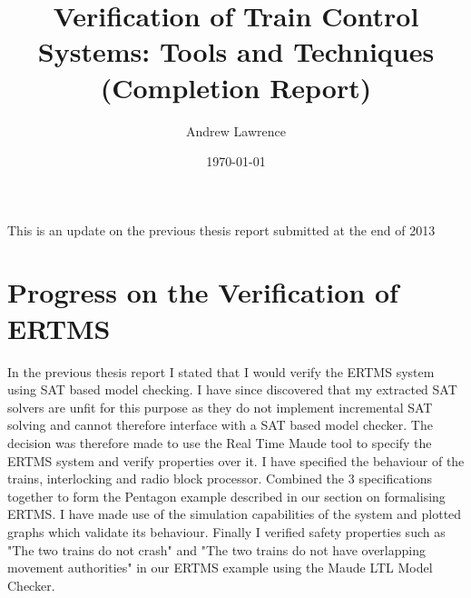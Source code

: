 \documentclass{article}
\title{Verification of Train Control Systems: Tools and Techniques (Completion Report)}
\date{\today}
\author{ 
   Andrew Lawrence}
\begin{document}
\maketitle
This is an update on the  previous thesis report submitted at the end of 2013



\section{Progress on the Verification of ERTMS}
In the previous thesis report I stated that I would verify the ERTMS system using SAT based model checking. I have since discovered that my extracted SAT solvers are unfit for this purpose as they do not implement incremental SAT solving and cannot therefore interface with a SAT based model checker. The decision was therefore made to use the Real Time Maude tool to specify the ERTMS system and verify properties over it. I have specified the behaviour of the trains, interlocking and radio block processor. Combined the 3 specifications together to form the Pentagon example described in our section on formalising ERTMS. I have made use of the simulation capabilities of the system and plotted graphs which validate its behaviour. Finally I verified safety properties such as "The two trains do not crash" and "The two trains do not have overlapping movement authorities" in our ERTMS example using the Maude LTL Model Checker.
\end{document}
